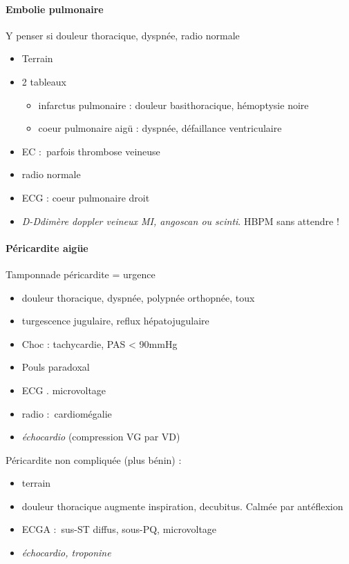 \paragraph{Embolie pulmonaire} Y penser si douleur thoracique, dyspnée, radio
normale \skull
\begin{itemize}
  \item Terrain
  \item 2 tableaux
    \begin{itemize}
      \item infarctus pulmonaire : douleur basithoracique, hémoptysie noire
      \item coeur pulmonaire aigü : dyspnée, défaillance ventriculaire
    \end{itemize}
  \item EC : parfois thrombose veineuse
  \item radio normale
  \item ECG : coeur pulmonaire droit
  \item \textit{D-Ddimère \thus doppler veineux MI, angoscan ou scinti}. HBPM sans
    attendre !
\end{itemize}

\paragraph{Péricardite aigüe}
Tamponnade péricardite = urgence \skull
\begin{itemize}
  \item douleur thoracique, dyspnée, polypnée \thus orthopnée, toux
  \item turgescence jugulaire, reflux hépatojugulaire
  \item Choc : tachycardie, PAS < 90mmHg
  \item Pouls paradoxal
  \item ECG . microvoltage
  \item radio : cardiomégalie
  \item \textit{échocardio}  (compression VG par VD)
\end{itemize}

Péricardite non compliquée (plus bénin) :
\begin{itemize}
  \item terrain
  \item douleur thoracique augmente inspiration, decubitus. Calmée par
    antéflexion
  \item ECGA : sus-ST diffus, sous-PQ, microvoltage
  \item \textit{échocardio, troponine} 
\end{itemize}

